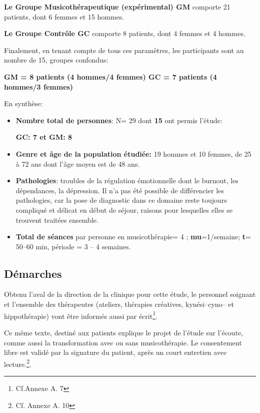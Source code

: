 \textbf{Le Groupe Musicothérapeutique (expérimental) GM} comporte 21
patients, dont 6
femmes et 15 hommes.

\textbf{Le  Groupe Contrôle GC} comporte 8 patients, dont 4 femmes et 4 hommes.

Finalement, en tenant compte de tous ces paramètres, les participants sont au nombre de 15, groupes confondus:

\textbf{GM = 8 patients (4 hommes/4 femmes)
GC = 7 patients (4 hommes/3 femmes)}



En synthèse:
 \begin{itemize}

 \item \textbf{Nombre total de personnes}: N= 29 dont \textbf{15} ont permis l'étude:


 \textbf{GC: 7 et GM: 8}
\item\textbf{Genre et âge de la population étudiée:}  19 hommes et 10 femmes, de 25 à 72
  ans dont l'âge moyen est de 48 ans.
 \item\textbf{Pathologies}: troubles de la régulation émotionnelle
   dont le burnout, les dépendances, la dépression.
   Il n'a pas été
   possible de différencier les pathologies, car la pose de
   diagnostic dans ce domaine reste toujours compliqué et délicat en début de séjour, raisons pour lesquelles elles
   se trouvent traitées ensemble.
 \item \textbf{Total de séances} par personne en
   musicothérapie= 4 ;   \textbf{mu}=1/semaine;
 \textbf{t}= 50--60 min, période = 3 -- 4 semaines.
\end{itemize}




\subsection{Démarches}
Obtenu l'aval de la direction de la
clinique pour cette étude,  le personnel soignant et l'ensemble des
thérapeutes (ateliers, thérapies créatives, kynési--cyno--
et hippothérapie) vont être informés aussi par écrit\footnote{Cf.Annexe A. 7}.

Ce même texte, destiné aux
patients explique le projet de l'étude sur l'écoute, comme aussi la transformation
avec ou sans musicothérapie.
Le consentement libre est validé par la signature du patient, après
un court entretien avec lecture.\footnote{Cf. Annexe A. 10}.


